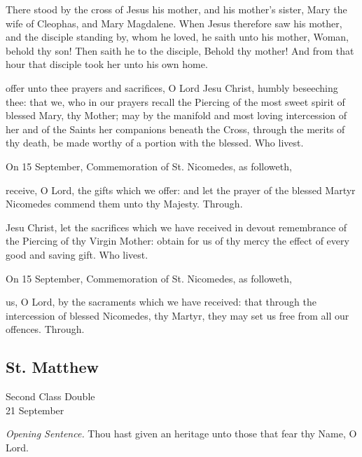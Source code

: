  There stood by the cross of Jesus his mother, and his mother's sister, Mary the wife of Cleophas, and Mary Magdalene. When Jesus therefore saw his mother, and the disciple standing by, whom he loved, he saith unto his mother, Woman, behold thy son! Then saith he to the disciple, Behold thy mother! And from that hour that disciple took her unto his own home.


\secret
{} offer unto thee prayers and sacrifices, O Lord Jesu Christ, humbly beseeching thee: that we, who in our prayers recall the Piercing of the most sweet spirit of blessed Mary, thy Mother; may by the manifold and most loving intercession of her and of the Saints her companions beneath the Cross, through the merits of thy death, be made worthy of a portion with the blessed. Who livest.\\%
\begin{rubric}
	 On 15 September, Commemoration of St. Nicomedes, as followeth,
\end{rubric}
 receive, O Lord, the gifts which we offer: and let the prayer of the blessed Martyr Nicomedes commend them unto thy Majesty. Through.


\postcommunion
{} Jesu Christ, let the sacrifices which we have received in devout remembrance of the Piercing of thy Virgin Mother: obtain for us of thy mercy the effect of every good and saving gift. Who livest.

\begin{rubric}
	 On 15 September, Commemoration of St. Nicomedes, as followeth,
\end{rubric}
 us, O Lord, by the sacraments which we have received: that through the intercession of blessed Nicomedes, thy Martyr, they may set us free from all our offences. Through.


\clearpage
\subsection{St. Matthew}
\begin{inhead}
    {Second Class Double\\
21 September}
\end{inhead}
\par\noindent
\textit{Opening Sentence.} Thou hast given an heritage unto those that fear thy Name, O Lord.

